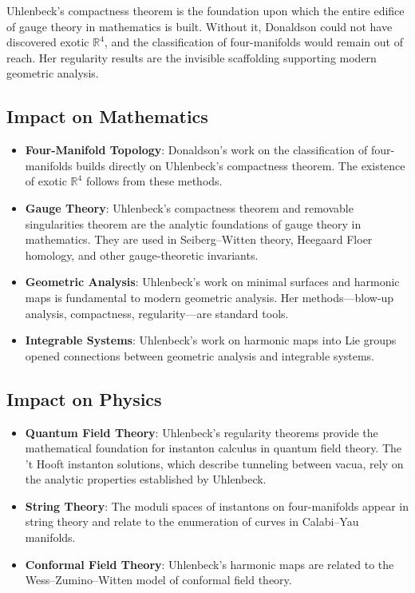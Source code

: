 \begin{whyitmatters}
Uhlenbeck's compactness theorem is the foundation upon which the
entire edifice of gauge theory in mathematics is built. Without it,
Donaldson could not have discovered exotic $\mathbb{R}^4$, and the
classification of four-manifolds would remain out of reach. Her
regularity results are the invisible scaffolding supporting modern
geometric analysis.
\end{whyitmatters}

\subsection{Impact on Mathematics}

\begin{itemize}
\item \textbf{Four-Manifold Topology}: Donaldson's work on the classification of four-manifolds builds directly on Uhlenbeck's compactness theorem. The existence of exotic $\mathbb{R}^4$ follows from these methods.
\item \textbf{Gauge Theory}: Uhlenbeck's compactness theorem and removable singularities theorem are the analytic foundations of gauge theory in mathematics. They are used in Seiberg--Witten theory, Heegaard Floer homology, and other gauge-theoretic invariants.
\item \textbf{Geometric Analysis}: Uhlenbeck's work on minimal surfaces and harmonic maps is fundamental to modern geometric analysis. Her methods---blow-up analysis, compactness, regularity---are standard tools.
\item \textbf{Integrable Systems}: Uhlenbeck's work on harmonic maps into Lie groups opened connections between geometric analysis and integrable systems.
\end{itemize}

\subsection{Impact on Physics}

\begin{itemize}
\item \textbf{Quantum Field Theory}: Uhlenbeck's regularity theorems provide the mathematical foundation for instanton calculus in quantum field theory. The 't Hooft instanton solutions, which describe tunneling between vacua, rely on the analytic properties established by Uhlenbeck.
\item \textbf{String Theory}: The moduli spaces of instantons on four-manifolds appear in string theory and relate to the enumeration of curves in Calabi--Yau manifolds.
\item \textbf{Conformal Field Theory}: Uhlenbeck's harmonic maps are related to the Wess--Zumino--Witten model of conformal field theory.
\end{itemize}

